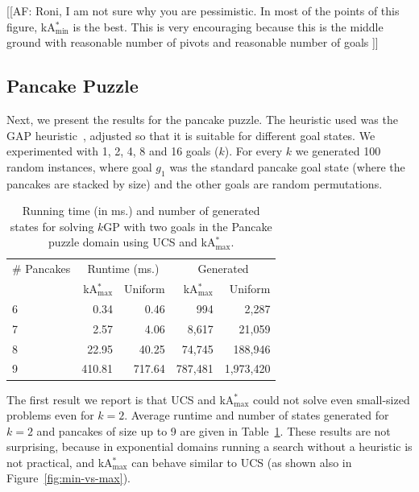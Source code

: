 \documentclass[twoside,11pt]{article}
\newcommand{\kgs}{$k$GP\xspace}
\newcommand{\kastarvar}[1]{\textup{kA}$^*_{#1}$\xspace}
\newcommand{\kastarmin}{\kastarvar{\min}}
\newcommand{\kastarmax}{\kastarvar{\max}}
\newcommand{\roni}[1]{\textbf{[RS:#1]}}
\begin{document}
[[AF: Roni, I am not sure why you are pessimistic. In most of the points of this figure, \kastarmin is the best. This is very encouraging because this is the middle ground with reasonable number of pivots and reasonable number of goals ]]

\subsection{Pancake Puzzle}

Next, we present the results for the pancake puzzle.
The heuristic used was the GAP heuristic~\cite{helmert2010landmark}, adjusted so that it is suitable for different goal states.
We experimented with 1, 2, 4, 8 and 16 goals ($k$).
For every $k$ we generated 100 random instances, where goal $g_1$ was the standard pancake goal state (where the pancakes are stacked by size) and the other goals are random permutations. %

\begin{table}
  \centering
  \caption{Running time (in ms.) and number of generated states for solving \kgs with two goals in the Pancake puzzle domain using UCS and \kastarmax.}
  \label{tab:pancake-max-uniform}
  \begin{tabular}{lrrrr}
    \toprule
    \# Pancakes & \multicolumn{2}{c}{Runtime (ms.)} & \multicolumn{2}{c}{Generated} \\
    \cmidrule(lr){2-3} \cmidrule(l){4-5}
                & \kastarmax & Uniform & \kastarmax & Uniform \\
    \midrule
    6           &   0.34     &   0.46     &     994             &     2,287 \\
    7           &   2.57     &   4.06     &   8,617             &    21,059 \\
    8           &  22.95     &  40.25     &  74,745             &   188,946 \\
    9           & 410.81     & 717.64     & 787,481             & 1,973,420 \\
    \bottomrule
  \end{tabular}
\end{table}


The first result we report is that UCS and \kastarmax could not solve even small-sized problems even for $k=2$.
Average runtime and number of states generated for $k=2$ and pancakes of size up to 9 are given in Table~\ref{tab:pancake-max-uniform}.
These results are not surprising, because in exponential domains running a search without a heuristic is not practical, and \kastarmax can behave similar to UCS (as shown also in Figure~\ref{fig:min-vs-max}).
\end{document}
